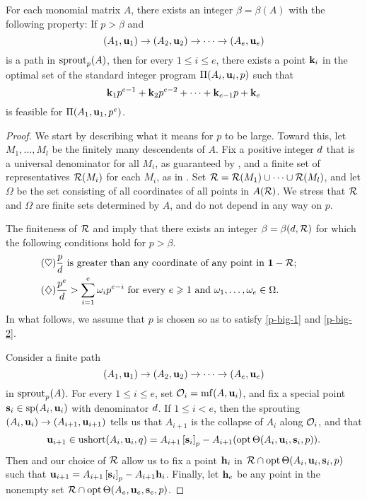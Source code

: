 \documentclass{amsart}
\begin{document}
\begin{theorem}
\label{ILL: T}
   For each monomial matrix $A$, there exists an integer $\beta = \beta(A)$ with the following property\textup:
   If $p>\beta$ and \[ (A_1, \mathbf{u}_1) \to (A_2, \mathbf{u}_2) \to \cdots \to (A_e, \mathbf{u}_e)\] is a path in $\operatorname{sprout}_p(A)$, then for every $1 \leq i \leq e$, there exists a point $\mathbf{k}_i$ in the optimal set of the standard integer program $\Pi(A_i, \mathbf{u}_i,p)$  such that
   \[
      \mathbf{k}_1 p^{e-1} + \mathbf{k}_2 p^{e-2} + \cdots + \mathbf{k}_{e-1} p + \mathbf{k}_e
   \]
   is feasible for $\Pi(A_1, \mathbf{u}_1, p^e)$.
 \end{theorem}

\begin{proof}
   We start by describing what it means for $p$ to be large.
   Toward this, let $M_1, \ldots, M_l$ be the finitely many descendents of  $A$.
   Fix a positive integer $d$ that is a universal denominator for all $M_i$, as guaranteed by , and a finite set of representatives $\mathcal{R}(M_i)$ for each $M_i$, as in .
   Set $\mathcal{R} = \mathcal{R}(M_1) \cup \cdots \cup \mathcal{R}(M_l)$, and let $\Omega$ be the set consisting of all coordinates of all points in $A(\mathcal{R})$.
   We stress that $\mathcal{R}$ and $\Omega$ are finite sets determined by $A$, and do not depend in any way on $p$.

   The finiteness of $\mathcal{R}$  and 
   imply that there exists an integer $\beta = \beta(d, \mathcal{R})$ for which the following conditions hold for $p > \beta$.
    \begin{align}
      \tag{$\heartsuit$} \label{p-big-1}
      &\text{$\frac{p}{d}$ is greater than any coordinate of any point in $\mathbf{1} - \mathcal{R}$;}\qquad\qquad\quad \\
      \tag{$\diamondsuit$} \label{p-big-2}
      &\text{$\frac{p^e}{d} > \sum_{i=1}^e \omega_i p^{e-i}$ for every $e \geqslant 1$ and $\omega_1, \ldots, \omega_e \in \Omega$.}
    \end{align}
    In what follows, we assume that $p$ is chosen so as to satisfy \eqref{p-big-1} and \eqref{p-big-2}.

    Consider a finite path
    \[ (A_1, \mathbf{u}_1) \to (A_2, \mathbf{u}_2) \to \cdots \to (A_e, \mathbf{u}_e) \]
    in $\operatorname{sprout}_p(A)$.
    For every $1 \leq i \leq e$, set $\mathcal{O}_i = \operatorname{mf}(A, \mathbf{u}_i)$, and fix a special point $\mathbf{s}_i \in \operatorname{sp}(A_i, \mathbf{u}_i)$ with denominator $d$.
    If $1 \leq i < e$, then the sprouting $(A_i, \mathbf{u}_i) \to (A_{i+1}, \mathbf{u}_{i+1})$ tells us that $A_{i+1}$ is the collapse of $A_i$ along $\mathcal{O}_i$, and that
    \[
       \mathbf{u}_{i+1} \in \operatorname{ushort}(A_i, \mathbf{u}_i, q)= A_{i+1} \left[ \mathbf{s}_i \right]_p - A_{i+1}(\operatorname{opt} \Theta( A_i, \mathbf{u}_i, \mathbf{s}_i, p)).
    \]
    Then  and our choice of $\mathcal{R}$ allow us to fix a point $\mathbf{h}_i$ in $\mathcal{R} \cap \operatorname{opt} \Theta ( A_i, \mathbf{u}_i, \mathbf{s}_i, p)$ such that $\mathbf{u}_{i+1} = A_{i+1} \left[ \mathbf{s}_i \right]_p - A_{i+1} \mathbf{h}_i$.
    Finally, let $\mathbf{h}_e$ be any point in the nonempty set $\mathcal{R} \cap \operatorname{opt} \Theta ( A_e, \mathbf{u}_e, \mathbf{s}_e, p)$.


\end{proof}
\end{document}
